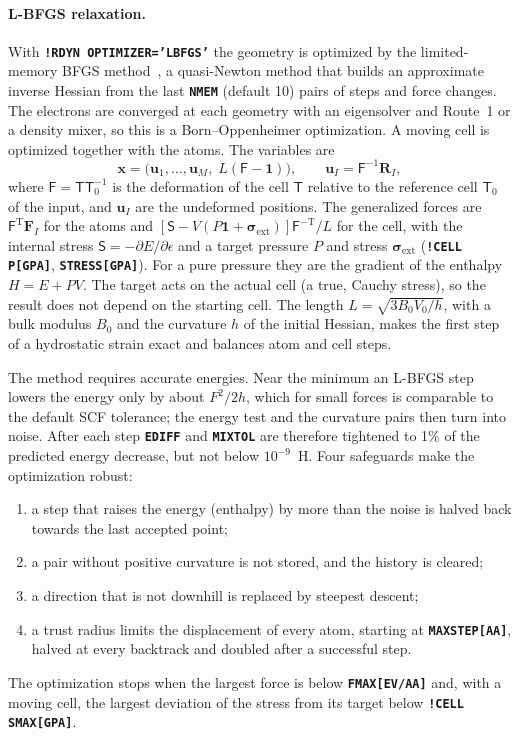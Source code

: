 \documentclass[11pt,a4paper,oneside]{book}
\newcommand{\key}[1]{\textbf{\texttt{#1}}}
\begin{document}
\paragraph{L-BFGS relaxation.} With \key{!RDYN OPTIMIZER='LBFGS'} the
geometry is optimized by the limited-memory BFGS
method~\cite{nocedal80_mc35_773,liu89_mp45_503}, a quasi-Newton method
that builds an approximate inverse Hessian from the last \key{NMEM}
(default 10) pairs of steps and force changes. The electrons are
converged at each geometry with an eigensolver and Route~1 or a density
mixer, so this is a Born--Oppenheimer optimization. A moving cell is
optimized together with the atoms. The variables are
\begin{equation}
  \bm x=\bigl(\bm u_1,\dots,\bm u_M,\;L(\mathsf F-\mathbf 1)\bigr),
  \qquad \bm u_I=\mathsf F^{-1}\bm R_I,
\end{equation}
where $\mathsf F=\mathsf T\mathsf T_0^{-1}$ is the deformation of the
cell $\mathsf T$ relative to the reference cell $\mathsf T_0$ of the input,
and $\bm u_I$ are the undeformed positions. The generalized forces are
$\mathsf F^{\mathrm T}\bm F_I$ for the atoms and
$[\mathsf S-V(P\mathbf 1+\bm\sigma_{\mathrm{ext}})]\mathsf F^{-\mathrm T}/L$ for
the cell, with the internal stress $\mathsf S=-\partial E/\partial\epsilon$
and a target pressure $P$ and stress $\bm\sigma_{\mathrm{ext}}$
(\key{!CELL P[GPA]}, \key{STRESS[GPA]}). For a pure pressure they are
the gradient of the enthalpy $H=E+PV$. The target acts on the actual
cell (a true, Cauchy stress), so the result does not depend on the
starting cell. The length $L=\sqrt{3B_0V_0/h}$, with a bulk modulus $B_0$
and the curvature $h$ of the initial Hessian, makes the first step of a
hydrostatic strain exact and balances atom and cell steps.

The method requires accurate energies. Near the minimum an L-BFGS step
lowers the energy only by about $F^2/2h$, which for small forces is
comparable to the default SCF tolerance; the energy test and the
curvature pairs then turn into noise. After each step \key{EDIFF} and
\key{MIXTOL} are therefore tightened to 1\% of the predicted energy
decrease, but not below $10^{-9}$~H. Four safeguards make the
optimization robust:
\begin{enumerate}
\item a step that raises the energy (enthalpy) by more than the noise is
  halved back towards the last accepted point;
\item a pair without positive curvature is not stored, and the history
  is cleared;
\item a direction that is not downhill is replaced by steepest descent;
\item a trust radius limits the displacement of every atom, starting at
  \key{MAXSTEP[AA]}, halved at every backtrack and doubled after a
  successful step.
\end{enumerate}
The optimization stops when the largest force is below
\key{FMAX[EV/AA]} and, with a moving cell, the largest deviation of the
stress from its target below \key{!CELL SMAX[GPA]}.
\end{document}
